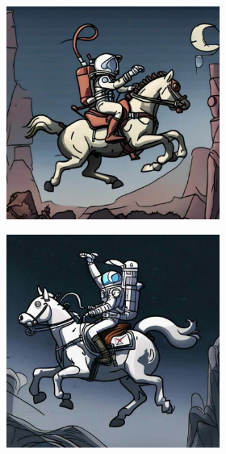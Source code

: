 \documentclass{article}
\begin{document}
\begin{figure}[h]
\begin{subfigure}[t]{\textwidth}
\begin{subfigure}[b]{0.19\textwidth}
         \includegraphics[width=\textwidth]{plots/process/generations/mist/diffpure.jpeg}
     \end{subfigure}
     \hfill
     \begin{subfigure}[b]{0.19\textwidth}
         \centering

         \includegraphics[width=\textwidth]{plots/process/generations/mist/impress.jpg}
     \end{subfigure}
     \hfill
     \begin{subfigure}[b]{0.19\textwidth}
         \centering


\end{subfigure}
\end{subfigure}
\end{figure}
\end{document}
